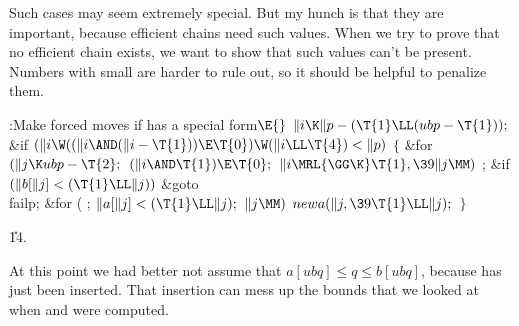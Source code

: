 Such cases may seem extremely special. But my hunch is that they are
important, because efficient chains need such values. When we try
to prove that no efficient chain exists, we want to show that
such values can't be present. Numbers with small  are harder
to rule out, so it should be helpful to penalize them.

\Y\B\4:Make forced moves if  has a special form\X${}\E{}$\6
$\|i\K\|p-(\T{1}\LL(\\{ubp}-\T{1}));{}$\6
\&{if} ${}(\|i\W((\|i\AND(\|i-\T{1}))\E\T{0})\W(\|i\LL\T{4})<\|p){}$\5
${}\{{}$\1\6
\&{for} ${}(\|j\K\\{ubp}-\T{2};{}$ ${}(\|i\AND\T{1})\E\T{0};{}$ ${}\|i\MRL{{%
\GG}{\K}}\T{1},\39\|j\MM){}$\1\5
;\2\6
\&{if} ${}(\|b[\|j]<(\T{1}\LL\|j)){}$\1\5
\&{goto} \\{failp};\2\6
\&{for} ( ; ${}\|a[\|j]<(\T{1}\LL\|j);{}$ ${}\|j\MM){}$\1\5
${}\\{newa}(\|j,\39\T{1}\LL\|j);{}$\2\6
\4${}\}{}$\2\par
\U14.\fi

At this point we had better not assume that $a[ubq]\le q\le b[ubq]$,
because  has just been inserted. That insertion can mess up the
bounds that we looked at when  and  were computed.

